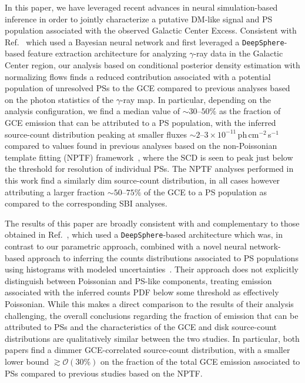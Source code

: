 \documentclass[prd,aps,10pt,nofootinbib,twocolumn,superscriptaddress,preprintnumbers,balancelastpage,longbibliography]{revtex4-1}
\begin{document}
In this paper, we have leveraged recent advances in neural simulation-based inference in order to jointly characterize a putative DM-like signal and PS population associated with the observed \Fermi Galactic Center Excess. Consistent with Ref.~\cite{List:2020mzd} which used a Bayesian neural network and first leveraged a \texttt{DeepSphere}-based feature extraction architecture for analyzing $\gamma$-ray data in the Galactic Center region, our analysis based on conditional posterior density estimation with normalizing flows finds a reduced contribution associated with a potential population of unresolved PSs to the GCE compared to previous analyses based on the photon statistics of the $\gamma$-ray map. In particular, depending on the analysis configuration, we find a median value of $\sim30$--$50\%$ as the fraction of GCE emission that can be attributed to a PS population, with the inferred source-count distribution peaking at smaller fluxes $\sim2$--$3\times 10^{-11}$\,ph\,cm$^{-2}$\,s$^{-1}$ compared to values found in previous analyses based on the non-Poissonian template fitting (NPTF) framework~\cite{Lee:2015fea}, where the SCD is seen to peak just below the threshold for resolution of individual PSs. The NPTF analyses performed in this work find a similarly dim source-count distribution, in all cases however attributing a larger fraction $\sim50$--$75\%$ of the GCE to a PS population as compared to the corresponding SBI analyses.

The results of this paper are broadly consistent with and complementary to those obtained in Ref.~\cite{List:2021aer}, which used a \texttt{DeepSphere}-based architecture which was, in contrast to our parametric approach, combined with a novel neural network-based approach to inferring the counts distributions associated to PS populations using histograms with modeled uncertainties~\cite{list2021earth}. Their approach does not explicitly distinguish between Poissonian and PS-like components, treating emission associated with the inferred counts PDF below some threshold as effectively Poissonian. While this makes a direct comparison to the results of their analysis challenging, the overall conclusions regarding the fraction of emission that can be attributed to PSs and the characteristics of the GCE and disk source-count distributions are qualitatively similar between the two studies. In particular, both papers find a dimmer GCE-correlated source-count distribution, with a smaller lower bound $\gtrsim \mathcal O(30\%)$ on the fraction of the total GCE emission associated to PSs compared to previous studies based on the NPTF.
\end{document}
